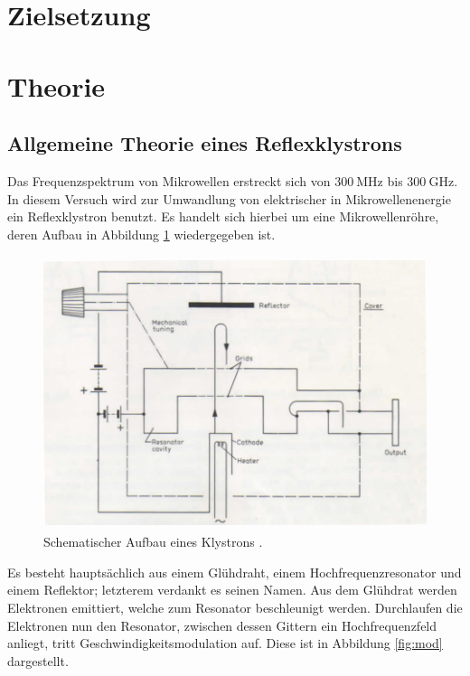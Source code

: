 \section{Zielsetzung}


\section{Theorie}
\label{sec:Theorie}
\subsection{Allgemeine Theorie eines Reflexklystrons}
\label{sec:klysto}

Das Frequenzspektrum von Mikrowellen erstreckt sich von $\SI{300}{\mega\hertz}$ bis $\SI{300}{\giga\hertz}$.
In diesem Versuch wird zur Umwandlung von elektrischer in Mikrowellenenergie ein Reflexklystron benutzt.
Es handelt sich hierbei um eine Mikrowellenröhre, deren Aufbau in Abbildung \ref{fig:klystron} wiedergegeben ist.

\begin{figure}
  \centering
  \includegraphics[height=8cm]{ressources/theorie.png}
  \caption{Schematischer Aufbau eines Klystrons \cite{skript}.}
  \label{fig:klystron}
\end{figure}

Es besteht hauptsächlich aus einem Glühdraht, einem Hochfrequenzresonator und einem Reflektor; letzterem verdankt es seinen Namen.
Aus dem Glühdrat werden Elektronen emittiert, welche zum Resonator beschleunigt werden.
Durchlaufen die Elektronen nun den Resonator, zwischen dessen Gittern ein Hochfrequenzfeld anliegt, tritt Geschwindigkeitsmodulation auf.
Diese ist in Abbildung \ref{fig:mod} dargestellt.

